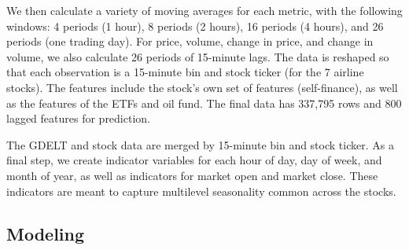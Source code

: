 \documentclass[12pt]{article}
\begin{document}
We then calculate a variety of moving averages for each metric, with the following windows: 4 periods (1 hour), 8 periods (2 hours), 16 periods (4 hours), and 26 periods (one trading day). For price, volume, change in price, and change in volume, we also calculate 26 periods of 15-minute lags. The data is reshaped so that each observation is a 15-minute bin and stock ticker (for the 7 airline stocks). The features include the stock's own set of features (self-finance), as well as the features of the ETFs and oil fund. The final data has 337,795 rows and 800 lagged features for prediction.

The GDELT and stock data are merged by 15-minute bin and stock ticker. As a final step, we create indicator variables for each hour of day, day of week, and month of year, as well as indicators for market open and market close. These indicators are meant to capture multilevel seasonality common across the stocks.

\subsection{Modeling}
\end{document}
